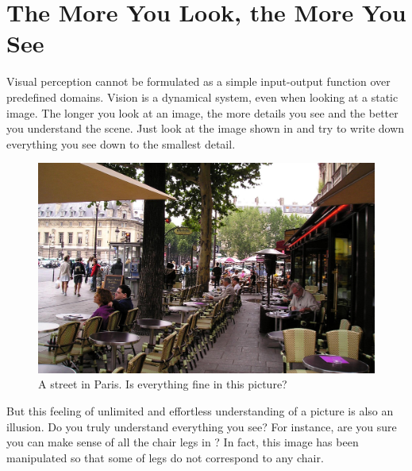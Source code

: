 \section{The More You Look, the More You See}
Visual perception cannot be formulated as a simple input-output function over predefined domains. Vision is a dynamical system, even when looking at a static image. The longer you look at an image, the more details you see and the better you understand the scene. Just look at the image shown in \fig{\ref{fig:street_in_paris}} and try to write down everything you see down to the smallest detail.


\begin{figure}[t]
    \centerline{
        \includegraphics[width=.98\linewidth]{figures/visionscience/ADE_train_00015819_messed_small.jpg}
    }
    \caption{A street in Paris. Is everything fine in this picture?}
    \label{fig:street_in_paris}
\end{figure}


But this feeling of unlimited and effortless understanding of a picture is also an illusion. Do you truly understand everything you see? For instance, are you sure you can make sense of all the chair legs in \fig{\ref{fig:street_in_paris}}? In fact, this image has been manipulated so that some of legs do not correspond to any chair.


